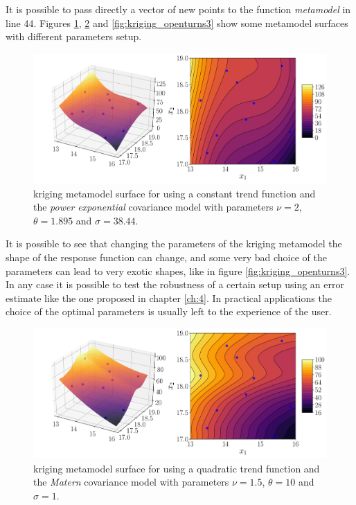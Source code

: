 \newpage

It is possible to pass directly a vector of new points to the function \textit{metamodel} in line 44. Figures \ref{fig:kriging_openturns}, \ref{fig:kriging_openturns2} and \ref{fig:kriging_openturns3} show some metamodel surfaces with different parameters setup.

\begin{figure}[h]
\centering
\includegraphics[width=0.9\linewidth]{appendix_a/kriging_openturns}
\caption{kriging metamodel surface for using a constant trend function and the \textit{power exponential} covariance model with parameters $\nu=2$, $\theta=1.895$ and $\sigma=38.44$.}
\label{fig:kriging_openturns}
\end{figure}

It is possible to see that changing the parameters of the kriging metamodel the shape of the response function can change, and some very bad choice of the parameters can lead to very exotic shapes, like in figure \ref{fig:kriging_openturns3}. In any case it is possible to test the robustness of a certain setup using an error estimate like the one proposed in chapter \ref{ch:4}. In practical applications the choice of the optimal parameters is usually left to the experience of the user.

\begin{figure}[h]
	\centering
	\includegraphics[width=0.9\linewidth]{appendix_a/kriging_openturns2}
	\caption{kriging metamodel surface for using a quadratic trend function and the \textit{Matern} covariance model with parameters $\nu=1.5$, $\theta=10$ and $\sigma=1$.}
	\label{fig:kriging_openturns2}
\end{figure}

